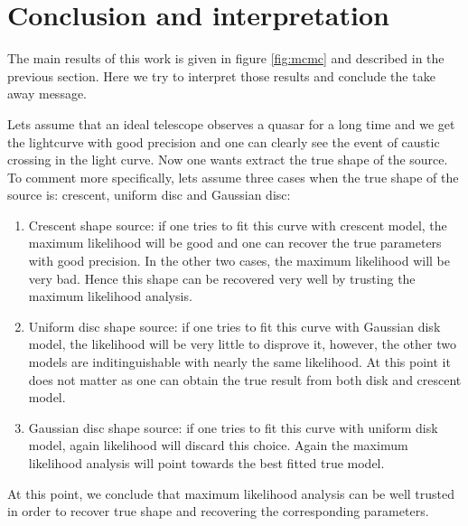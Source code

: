 \section{Conclusion and interpretation}
The main results of this work is given in figure \ref{fig:mcmc} and described in the previous section. Here we try to interpret those results and conclude the take away message.

Lets assume that an ideal telescope observes a quasar for a long time and we get the lightcurve with good precision and one can clearly see the event of caustic crossing in the light curve. Now one wants extract the true shape of the source. To comment more specifically, lets assume three cases when the true shape of the source is: crescent, uniform disc and Gaussian disc:

\begin{enumerate}

\item Crescent shape source: if one tries to fit this curve with crescent model, the maximum likelihood will be good and one can recover the true parameters with good precision. In the other two cases, the maximum likelihood will be very bad. Hence this shape can be recovered very well by trusting the maximum likelihood analysis.
\item Uniform disc shape source: if one tries to fit this curve with Gaussian disk model, the likelihood will be very little to disprove it, however, the other two models are inditinguishable with nearly the same likelihood. At this point it does not matter as one can obtain the true result from both disk and crescent model.
\item Gaussian disc shape source: if one tries to fit this curve with uniform disk model, again likelihood will discard this choice. Again the maximum likelihood analysis will point towards the best fitted true model.

\end{enumerate}

At this point, we conclude that maximum likelihood analysis can be well trusted in order to recover true shape and recovering the corresponding parameters.

 
